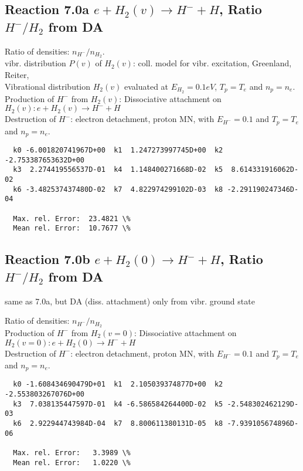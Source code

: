 \documentclass[12pt,dvipdfmx]{article}
\begin{document}
\subsection{
Reaction 7.0a    $ e + H_2(v) \rightarrow H^- + H$, Ratio \ $H^-/H_2$ from DA
}



 Ratio of densities: $n_{H^-}/n_{H_2}$. \\
  vibr. distribution $P(v)$ of $H_2(v)$: coll. model for vibr. excitation, Greenland, Reiter, \cite{kn:Green}\\

  Vibrational distribution $H_2(v)$ evaluated
  at $E_{H_2} = 0.1 eV$, $T_p = T_e$ and $n_p = n_e$.\\
  Production of $H^-$ from $H_2(v)$:  Dissociative attachment on $H_2(v):  e+H_2(v) \rightarrow H^- + H$  \\
  Destruction of $H^-$: electron detachment, proton MN, with $E_{H^-}=0.1$ and $T_p = T_e$ and $n_p = n_e$.

\begin{small}\begin{verbatim}
  k0 -6.001820741967D+00  k1  1.247273997745D+00  k2 -2.753387653632D+00
  k3  2.274419556537D-01  k4  1.148400271668D-02  k5  8.614331916062D-02
  k6 -3.482537437480D-02  k7  4.822974299102D-03  k8 -2.291190247346D-04

  Max. rel. Error:  23.4821 \%
  Mean rel. Error:  10.7677 \%
\end{verbatim}\end{small}

\subsection{
Reaction 7.0b      $ e + H_2(0) \rightarrow H^- + H$, Ratio \ $H^-/H_2$ from DA
}


 same as 7.0a, but DA (diss. attachment) only from vibr. ground state

  Ratio of densities: $n_{H^-}/n_{H_2}$\\
  Production of $H^-$ from $H_2(v=0)$: Dissociative attachment on $H_2(v=0):  e+H_2(0) \rightarrow H^- + H$    \\
  Destruction of $H^-$: electron detachment, proton MN, with $E_{H^-}=0.1$ and $T_p = T_e$ and $n_p = n_e$.

\begin{small}\begin{verbatim}
  k0 -1.608434690479D+01  k1  2.105039374877D+00  k2 -2.553803267076D+00
  k3  7.038135447597D-01  k4 -6.586584264400D-02  k5 -2.548302462129D-03
  k6  2.922944743984D-04  k7  8.800611380131D-05  k8 -7.939105674896D-06

  Max. rel. Error:   3.3989 \%
  Mean rel. Error:   1.0220 \%
\end{verbatim}\end{small}
\end{document}
